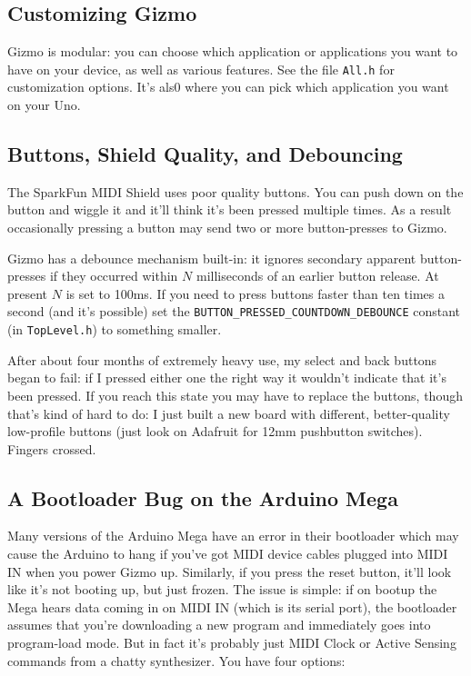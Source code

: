 \documentclass{article}
\begin{document}
\subsection{Customizing Gizmo}

Gizmo is modular: you can choose which application or applications you want to have on your device, as well as various features.  See the file \texttt{All.h} for customization options.  It's als0 where you can pick which application you want on your Uno.

\subsection{Buttons, Shield Quality, and Debouncing}
\label{debouncing}

The SparkFun MIDI Shield uses poor quality buttons.  You can push down on the button and wiggle it and it'll think it's been pressed multiple times.  As a result occasionally pressing a button may send two or more button-presses to Gizmo.

Gizmo has a debounce mechanism built-in: it ignores secondary apparent button-presses if they occurred within \(N\) milliseconds of an earlier button release.  At present \(N\) is set to 100ms.  If you need to press buttons faster than ten times a second (and it's possible) set the \texttt{BUTTON\_PRESSED\_COUNTDOWN\_DEBOUNCE} constant (in \texttt{TopLevel.h}) to something smaller.

After about four months of extremely heavy use, my select and back buttons began to fail: if I pressed either one the right way it wouldn't indicate that it's been pressed.  If you reach this state you may have to replace the buttons, though that's kind of hard to do: I just built a new board with different, better-quality low-profile buttons (just look on Adafruit for 12mm pushbutton switches).  Fingers crossed.

\subsection{A Bootloader Bug on the Arduino Mega}

Many versions of the Arduino Mega have an error in their bootloader which may cause the Arduino to hang if you've got MIDI device cables plugged into MIDI IN when you power Gizmo up.  Similarly, if you press the reset button, it'll look like it's not booting up, but just frozen.  The issue is simple: if on bootup the Mega hears data coming in on MIDI IN (which is its serial port), the bootloader assumes that you're downloading a new program and immediately goes into program-load mode.    But in fact it's probably just MIDI Clock or Active Sensing commands from a chatty synthesizer.  You have four options:
\end{document}
